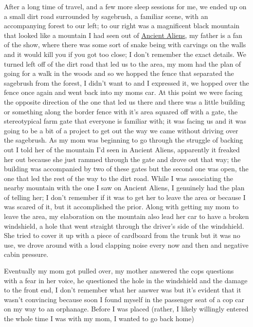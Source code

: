 \documentclass[12pt]{article}
\begin{document}
After a long time of travel, and a few more sleep sessions for me, we ended up
on a small dirt road surrounded by sagebrush, a familiar scene, with an
accompanying forest to our left; to our right was a magnificent black mountain
that looked like a mountain I had seen out of
{\color{blue}\underline{\href{https://www.history.com/shows/ancient-aliens}
{Ancient Aliens}}}, my father is a fan of the show, where there was some sort
of snake being with carvings on the walls and it would kill you if you got too
close; I don't remember the exact details. We turned left off of the dirt road
that led us to the area, my mom had the plan of going for a walk in the woods
and so we hopped the fence that separated the sagebrush from the forest, I
didn't want to and I expressed it, we hopped over the fence once again and went
back into my moms car. At this point we were facing the opposite direction of
the one that led us there and there was a little building or something along
the border fence with it's area squared off with a gate, the stereotypical farm
gate that everyone is familiar with; it was facing us and it was going to be a
bit of a project to get out the way we came without driving over the sagebrush.
As my mom was beginning to go through the struggle of backing out I told her of
the mountain I'd seen in Ancient Aliens, apparently it freaked her out because
she just rammed through the gate and drove out that way; the building was
accompanied by two of these gates but the second one was open, the one that led
the rest of the way to the dirt road. While I was associating the nearby
mountain with the one I saw on Ancient Aliens, I genuinely had the plan of
telling her; I don't remember if it was to get her to leave the area or because
I was scared of it, but it accomplished the prior. Along with getting my mom to
leave the area, my elaboration on the mountain also lead her car to have a
broken windshield, a hole that went straight through the driver's side of the
windshield. She tried to cover it up with a piece of cardboard from the trunk
but it was no use, we drove around with a loud clapping noise every now and
then and negative cabin pressure.

Eventually my mom got pulled over, my mother answered the cops questions with a
fear in her voice, he questioned the hole in the windshield and the damage to
the front end, I don't remember what her answer was but it's evident that it
wasn't convincing because soon I found myself in the passenger seat of a cop
car on my way to an orphanage. Before I was placed (rather, I likely willingly
entered the whole time I was with my mom, I wanted to go back home) 
\end{document}
